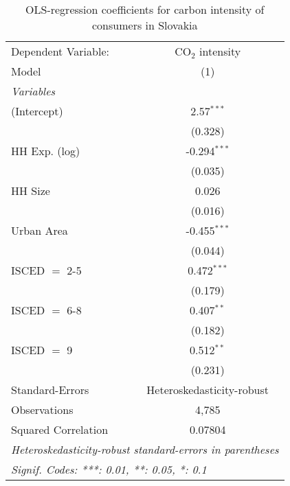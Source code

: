 
\begin{table}[htbp!]
   \centering
   \small
   \begin{adjustbox}{width = 1\textwidth, max height = 0.95\textheight, center}
      \begin{threeparttable}[b]
         \caption{\label{tab:OLS_1_SVK} OLS-regression coefficients for carbon intensity of consumers in Slovakia}
         \begin{tabular}{lc}
            \tabularnewline \midrule \midrule
            Dependent Variable: & CO$_{2}$ intensity\\  
            Model               & (1)\\  
            \midrule
            \emph{Variables}\\
            (Intercept)         & 2.57$^{***}$\\   
                                & (0.328)\\   
            HH Exp. (log)       & -0.294$^{***}$\\   
                                & (0.035)\\   
            HH Size             & 0.026\\   
                                & (0.016)\\   
            Urban Area          & -0.455$^{***}$\\   
                                & (0.044)\\   
            ISCED $=$ 2-5       & 0.472$^{***}$\\   
                                & (0.179)\\   
            ISCED $=$ 6-8       & 0.407$^{**}$\\   
                                & (0.182)\\   
            ISCED $=$ 9         & 0.512$^{**}$\\   
                                & (0.231)\\   
            \midrule 
            Standard-Errors     & Heteroskedasticity-robust \\   
            Observations        & 4,785\\  
            Squared Correlation & 0.07804\\  
            \midrule \midrule
            \multicolumn{2}{l}{\emph{Heteroskedasticity-robust standard-errors in parentheses}}\\
            \multicolumn{2}{l}{\emph{Signif. Codes: ***: 0.01, **: 0.05, *: 0.1}}\\
         \end{tabular}
         

\end{threeparttable}
\end{adjustbox}
\end{table}
